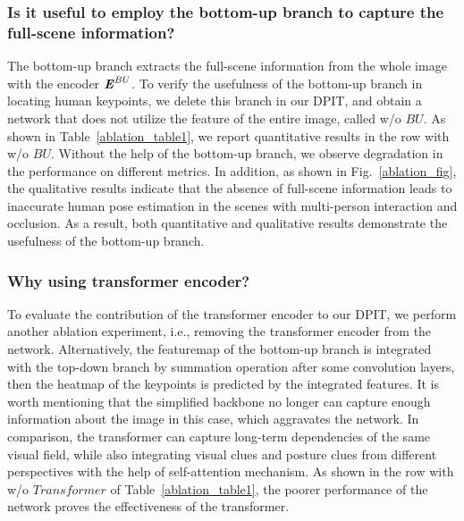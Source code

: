 \documentclass[runningheads]{llncs}
\begin{document}
\subsubsection{Is it useful to employ the bottom-up branch to capture the full-scene information?}
The bottom-up branch extracts the full-scene information from the whole image with the encoder $\textbf{\textit{E}}_{}^{BU}$. To verify the usefulness of the bottom-up branch in locating human keypoints, we delete this branch in our DPIT, and obtain a network that does not utilize the feature of the entire image, called w/o $BU$. As shown in Table~\ref{ablation_table1}, we report quantitative results in the row with w/o $BU$. Without the help of the bottom-up branch, we observe degradation in the performance on different metrics. In addition, as shown in Fig.~\ref{ablation_fig}, the qualitative results indicate that the absence of full-scene information leads to inaccurate human pose estimation in the scenes with multi-person interaction and occlusion. As a result, both quantitative and qualitative results demonstrate the usefulness of the bottom-up branch.

\subsubsection{Why using transformer encoder?}
To evaluate the contribution of the transformer encoder to our DPIT, we perform another ablation experiment, i.e., removing the transformer encoder from the network. Alternatively, the featuremap of the bottom-up branch is integrated with the top-down branch by summation operation after some convolution layers, then the heatmap of the keypoints is predicted by the integrated features. It is worth mentioning that the simplified backbone no longer can capture enough information about the image in this case, which aggravates the network. In comparison, the transformer can capture long-term dependencies of the same visual field, while also integrating visual clues and posture clues from different perspectives with the help of self-attention mechanism. As shown in the row with w/o $Transformer$ of Table~\ref{ablation_table1}, the poorer performance of the network proves the effectiveness of the transformer.
\end{document}
